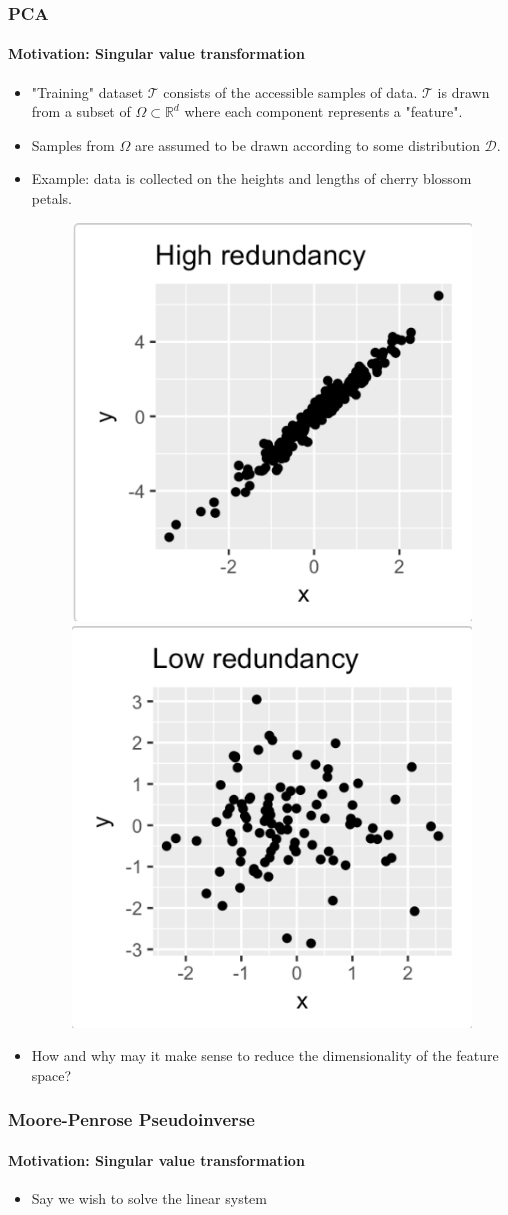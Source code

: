 \documentclass{beamer}
\newcommand\0{\mathbf{0}}
\newcommand\RR{\mathbb{R}}
\newcommand\<{\langle}
\renewcommand\>{\rangle}
\begin{document}
  \begin{frame}
  	\frametitle{PCA}
    \framesubtitle{Motivation: Singular value transformation}
    \begin{itemize}
    \item "Training" dataset $\mathcal{T}$ consists of the accessible samples of data. $\mathcal{T}$ is drawn from a subset of $\Omega \subset \RR^d$ where each component represents a "feature". 
    \item Samples from $\Omega$ are assumed to be drawn according to some distribution $\mathcal{D}$. 
    \item Example: data is collected on the heights and lengths of cherry blossom petals. 
    \begin{figure}
   \includegraphics[width= 0.3\linewidth]{pca_high_redundancy.png}
   \includegraphics[width= 0.3\linewidth]{pca_low_redundancy}	
\end{figure}
\item How and why may it make sense to reduce the dimensionality of the feature space?
\end{itemize}
\end{frame}

\begin{frame}
\frametitle{Moore-Penrose Pseudoinverse}
    \framesubtitle{Motivation: Singular value transformation}
    \begin{itemize}
    \item Say we wish to solve the linear system 	
    \end{itemize}
	
\end{frame}
\end{document}
